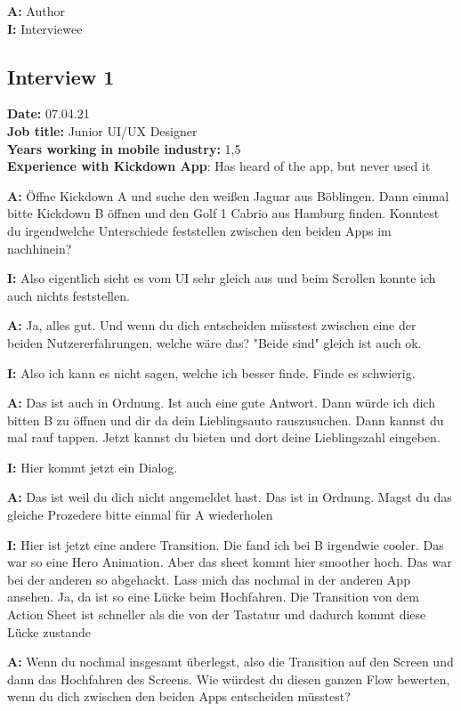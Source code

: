 \textbf{A:} Author\\
\textbf{I:} Interviewee

\subsection{Interview 1}
\textbf{Date:} 07.04.21\\
\textbf{Job title:} Junior UI/UX Designer\\
\textbf{Years working in mobile industry:} 1,5\\
\textbf{Experience with Kickdown App}: Has heard of the app, but never used it\\

\begin{myparindent}{0pt}

\textbf{A:} Öffne Kickdown A und suche den weißen Jaguar aus Böblingen. Dann einmal bitte Kickdown B öffnen und den Golf 1 Cabrio aus Hamburg finden. Konntest du irgendwelche Unterschiede feststellen zwischen den beiden Apps im nachhinein?

\textbf{I:} Also eigentlich sieht es vom UI sehr gleich aus und beim Scrollen konnte ich auch nichts feststellen. 

\textbf{A:} Ja, alles gut. Und wenn du dich entscheiden müsstest zwischen eine der beiden Nutzererfahrungen, welche wäre das? "Beide sind" gleich ist auch ok.

\textbf{I:} Also ich kann es nicht sagen, welche ich besser finde. Finde es schwierig. 

\textbf{A:} Das ist auch in Ordnung. Ist auch eine gute Antwort. Dann würde ich dich bitten B zu öffnen und dir da dein Lieblingsauto rauszusuchen. Dann kannst du mal rauf tappen. Jetzt kannst du bieten und dort deine Lieblingszahl eingeben.

\textbf{I:} Hier kommt jetzt ein Dialog.

\textbf{A:} Das ist weil du dich nicht angemeldet hast. Das ist in Ordnung. Magst du das gleiche Prozedere bitte einmal für A wiederholen 

\textbf{I:} Hier ist jetzt eine andere Transition. Die fand ich bei B irgendwie cooler. Das war so eine Hero Animation. Aber das sheet kommt hier smoother hoch. Das war bei der anderen so abgehackt. Lass mich das nochmal in der anderen App ansehen. Ja, da ist so eine Lücke beim Hochfahren. Die Transition von dem Action Sheet ist schneller als die von der Tastatur und dadurch kommt diese Lücke zustande

\textbf{A:}  Wenn du nochmal insgesamt überlegst, also die Transition auf den Screen und dann das Hochfahren des Screens. Wie würdest du diesen ganzen Flow bewerten, wenn du dich zwischen den beiden Apps entscheiden müsstest?


\end{myparindent}

